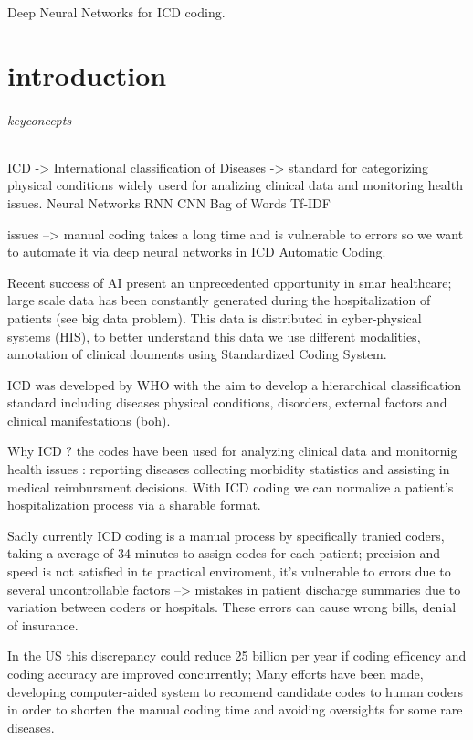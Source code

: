 Deep Neural Networks for ICD coding. 
\part{introduction}
\paragraph{keyconcepts}
ICD -> International classification of Diseases -> standard for categorizing physical conditions 
widely userd for analizing clinical data and monitoring health issues. 
Neural Networks 
RNN 
CNN 
Bag of Words 
Tf-IDF 

issues --> manual coding takes a long time and is vulnerable to errors so we want to automate 
it via deep neural networks in ICD Automatic Coding. 

Recent success of AI present an unprecedented opportunity in smar healthcare; large scale 
data has been constantly generated during the hospitalization of patients (see big data problem). 
This data is distributed in cyber-physical systems (HIS), to better understand this data we use 
different modalities, annotation of clinical douments using Standardized Coding System. 

ICD was developed by WHO with the aim to develop a hierarchical classification standard including diseases 
physical conditions, disorders, external factors and clinical manifestations (boh). 

Why ICD ? the codes have been used for analyzing clinical data and monitornig health issues : reporting diseases 
collecting morbidity statistics and assisting in medical reimbursment decisions. 
With ICD coding we can normalize a patient's hospitalization process via a sharable format. 

Sadly currently ICD coding is a manual process by specifically tranied coders, taking a average of 34 minutes 
to assign codes for each patient; precision and speed is not satisfied in te practical enviroment, it's 
vulnerable to errors due to several uncontrollable factors --> mistakes in patient discharge summaries due to 
variation between coders or hospitals. These errors can cause wrong bills, denial of insurance. 

In the US this discrepancy could reduce 25 billion per year if coding efficency and coding accuracy are improved 
concurrently; Many efforts have been made, developing computer-aided system to recomend candidate codes to human 
coders in order to shorten the manual coding time and avoiding oversights for some rare diseases. 

